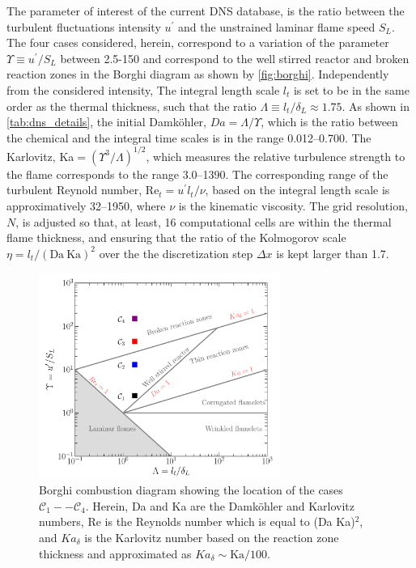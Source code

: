 The parameter of interest of the current DNS database, is the ratio between the turbulent 
fluctuations intensity $u^{\prime}$ and the unstrained laminar flame speed $S_L$.
%
The four cases considered, herein, correspond to a variation of the parameter $\Upsilon\equiv 
u^{\prime}/S_L$ between 2.5-150 and correspond to the well stirred reactor and broken reaction
zones in the Borghi diagram as shown by \autoref{fig:borghi}.
%
Independently from the considered intensity, The integral length scale $l_t$ is set to be in the
same order as the thermal thickness, such that the ratio $\Lambda \equiv l_t/\delta_L\approx 1.75$.
%
As shown in \autoref{tab:dns_details}, the initial Damk\"ohler, $Da=\Lambda/\Upsilon$, which is the ratio between
the chemical and the integral time scales is in the range 0.012--0.700.
%
The Karlovitz, Ka$=(\Upsilon^3/\Lambda)^{1/2}$, which measures the relative turbulence strength 
to the flame corresponds to the range 3.0--1390.
%
The corresponding range of the turbulent Reynold number, $\mathrm{Re}_t=u^{\prime}l_t/\nu$, based on the integral length scale is approximatively 32--1950, where $\nu$ is the kinematic viscosity.
%
The grid resolution, $N$, is adjusted so that, at least, 16 computational cells are within the
thermal flame thickness, and ensuring that the ratio of the Kolmogorov scale $\eta=l_t/(\mathrm{Da~Ka})^2$ 
over the the discretization step $\Delta x$  is kept larger than 1.7.

\begin{figure}[htbp]
    \centering
    \includegraphics[width=0.7\textwidth]{./figs/borghi.pdf}
    \caption{Borghi combustion diagram showing the location of the cases $\mathcal{C}_1--\mathcal{C}_4$.
    Herein, Da and Ka are the Damk\"ohler and Karlovitz numbers, Re is the Reynolds number which is
    equal to (Da Ka)$^2$, and $Ka_\delta$ is the Karlovitz number based on the reaction zone thickness
    and approximated as $Ka_\delta\sim \mathrm{Ka}/100$.}
    \label{fig:borghi}
\end{figure}


